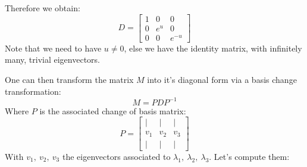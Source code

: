 \documentclass{article}
\begin{document}
Therefore we obtain:
\begin{equation}
    D = \begin{bmatrix} 1 & 0 & 0 \\ 0 & e^u & 0 \\0 & 0 & e^{-u} \end{bmatrix}
\end{equation}
Note that we need to have $u \neq 0$, else we have the identity matrix, with infinitely many, trivial eigenvectors.

One can then transform the matrix $M$ into it's diagonal form via a basis change transformation:
\begin{equation}
    M = PDP^{-1}
\end{equation}
Where $P$ is the associated change of basis matrix:
\begin{equation}
    P = \begin{bmatrix}
        | & | & | \\
        v_1 & v_2 & v_3 \\
        | & | & |
    \end{bmatrix}
\end{equation} With $v_1,\ v_2,\ v_3$ the eigenvectors associated to $\lambda_1,\ \lambda_2,\ \lambda_3$. Let's compute them:
\end{document}

